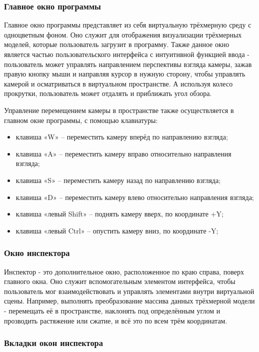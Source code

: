 \subsubsection{Главное окно программы}

Главное окно программы представляет из себя виртуальную трёхмерную среду с одноцветным фоном. Оно служит для отображения визуализации трёхмерных моделей, которые пользователь загрузит в программу. Также данное окно является частью пользовательского интерфейса с интуитивной функцией ввода - пользователь может управлять направлением перспективы взгляда камеры, зажав правую кнопку мыши и направляя курсор в нужную сторону, чтобы управлять камерой и осматриваться в виртуальном пространстве. А используя колесо прокрутки, пользователь может отдалять и приближать угол обзора.

Управление перемещением камеры в пространстве также осуществляется в главном окне программы, с помощью клавиатуры:
\begin{itemize}
	\item клавиша «W» – переместить камеру вперёд по направлению взгляда;
	\item клавиша «A» – переместить камеру вправо относительно направления взгляда;
	\item клавиша «S» – переместить камеру назад по направлению взгляда;
	\item клавиша «D» – переместить камеру влево относительно направления взгляда;
	\item клавиша «левый Shift» – поднять камеру вверх, по координате +Y;
	\item клавиша «левый Ctrl» – опустить камеру вниз, по координате -Y;
\end{itemize}

\subsubsection{Окно инспектора}

Инспектор - это дополнительное окно, расположенное по краю справа, поверх главного окна. Оно служит вспомогательным элементом интерфейса, чтобы пользователь мог взаимодействовать и управлять элементами внутри виртуальной сцены. Например, выполнять преобразование массива данных трёхмерной модели - перемещать её в пространстве, наклонять под определённым углом и прозводить растяжение или сжатие, и всё это по всем трём координатам.

\subsubsection{Вкладки окон инспектора}

